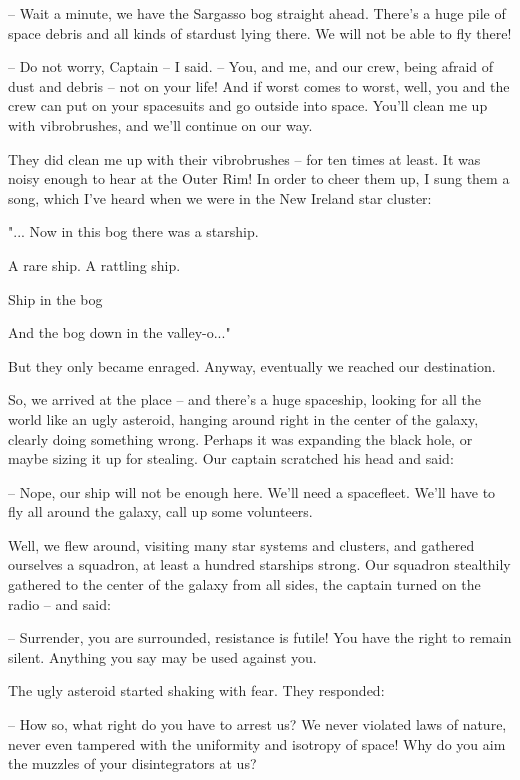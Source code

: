 \documentclass[ebook,twoside,final,openright]{memoir}
\begin{document}
– Wait a minute, we have the Sargasso bog straight ahead. There's a huge pile of space debris and all kinds of stardust lying there. We will not be able to fly there!\par
– Do not worry, Captain – I said. – You, and me, and our crew, being afraid of dust and debris – not on your life! And if worst comes to worst, well, you and the crew can put on your spacesuits and go outside into space. You’ll clean me up with vibrobrushes, and we’ll continue on our way.\par
\par
They did clean me up with their vibrobrushes – for ten times at least. It was noisy enough to hear at the Outer Rim! In order to cheer them up, I sung them a song, which I’ve heard when we were in the New Ireland star cluster: \par
"... Now in this bog there was a starship.\par
A rare ship. A rattling ship.\par
Ship in the bog\par
And the bog down in the valley-o..."\par
 But they only became enraged. Anyway, eventually we reached our destination.\par
\par
So, we arrived at the place – and there’s a huge spaceship, looking for all the world like an ugly asteroid, hanging around right in the center of the galaxy, clearly doing something wrong. Perhaps it was expanding the black hole, or maybe sizing it up for stealing. Our captain scratched his head and said:\par
– Nope, our ship will not be enough here. We’ll need a spacefleet. We'll have to fly all around the galaxy, call up some volunteers.\par
Well, we flew around, visiting many star systems and clusters, and gathered ourselves a squadron, at least a hundred starships strong. Our squadron stealthily gathered to the center of the galaxy from all sides, the captain turned on the radio – and said:\par
– Surrender, you are surrounded, resistance is futile! You have the right to remain silent. Anything you say may be used against you.\par
The ugly asteroid started shaking with fear. They responded:\par
– How so, what right do you have to arrest us? We never violated laws of nature, never even tampered with the uniformity and isotropy of space! Why do you aim the muzzles of your disintegrators at us?\par
\end{document}
